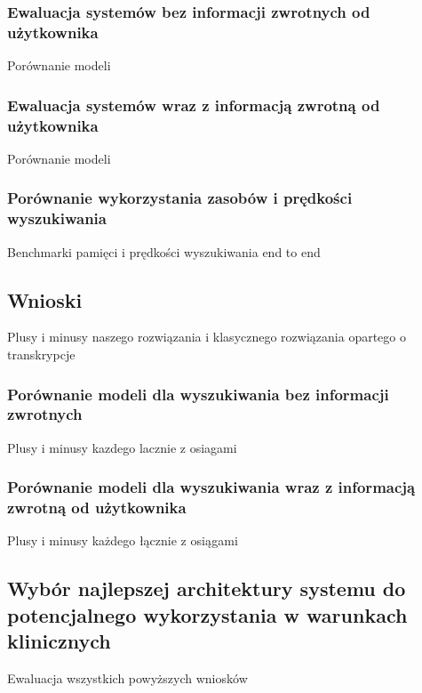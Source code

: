 \subsubsection{Ewaluacja systemów bez informacji zwrotnych od użytkownika}
Porównanie modeli
\subsubsection{Ewaluacja systemów wraz z informacją zwrotną od użytkownika}
Porównanie modeli
\subsubsection{Porównanie wykorzystania zasobów i prędkości wyszukiwania}
Benchmarki pamięci i prędkości wyszukiwania end to end

\subsection{Wnioski}
Plusy i minusy naszego rozwiązania i klasycznego rozwiązania opartego o transkrypcje
\subsubsection{Porównanie modeli dla wyszukiwania bez informacji zwrotnych}
Plusy i minusy kazdego lacznie z osiagami
\subsubsection{Porównanie modeli dla wyszukiwania wraz z informacją zwrotną od użytkownika}
Plusy i minusy każdego łącznie z osiągami
\subsection{Wybór najlepszej architektury systemu do potencjalnego wykorzystania w warunkach klinicznych}
Ewaluacja wszystkich powyższych wniosków